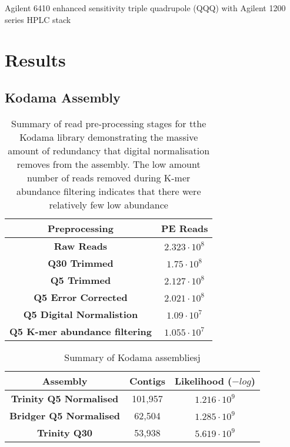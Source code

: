Agilent 6410 enhanced sensitivity triple quadrupole (QQQ) 
with Agilent 1200 series HPLC stack





\section{Results}

\subsection{Kodama Assembly}

\begin{table}
    \centering
    \begin{tabular}{|c|c|}
        \hline
        \textbf{Preprocessing} & \textbf{PE Reads} \\
        \hline
        \textbf{Raw Reads}  & \(2.323\cdot10^{8}\)\\
        \textbf{Q30 Trimmed} & \(1.75\cdot10^{8}\)\\
        \textbf{Q5 Trimmed}  & \(2.127\cdot10^{8} \) \\
        \textbf{Q5 Error Corrected}  & \(2.021\cdot10^{8}\)\\
        \textbf{Q5 Digital Normalistion} & \(1.09 \cdot10^{7}\)\\ 
        \textbf{Q5 K-mer abundance filtering} & \(1.055\cdot10^{7}\)\\
        \hline
    \end{tabular}
    \caption{Summary of read pre-processing stages for tthe Kodama library demonstrating
    the massive amount of redundancy that digital normalisation removes from the assembly.
The low amount number of reads removed during K-mer abundance filtering indicates
that there were relatively few low abundance 
}
    \label{tab:kodama_preproc}
\end{table}

\begin{table}
    \centering
    \begin{tabular}{|c|c|c|}
        \hline
        \textbf{Assembly} & \textbf{Contigs} & \textbf{Likelihood (\(-log\))}\\
        \hline
        \textbf{Trinity Q5 Normalised}  & 101,957 & \(1.216\cdot10^9\)\\
        \textbf{Bridger Q5 Normalised} & 62,504 & \(1.285\cdot10^9\)\\
        \textbf{Trinity Q30} & 53,938  & \(5.619\cdot10^{9} \) \\
        \hline
    \end{tabular}
    \caption{Summary of Kodama assembliesj}
    \label{tab:kodama_assembly}
\end{table}

